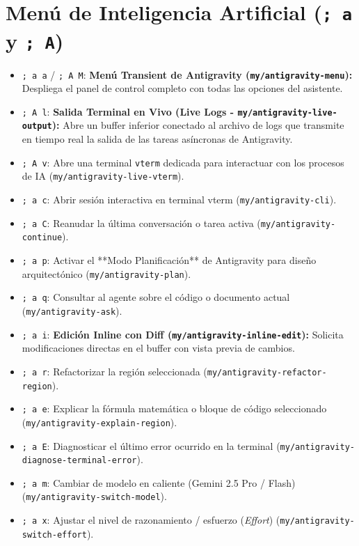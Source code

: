 \documentclass[11pt,book,spanish,alphabetic]{apuntes-scr}
\begin{document}
\section{Menú de Inteligencia Artificial (\texttt{; a} y \texttt{; A})}
\begin{itemize}[leftmargin=8mm]
    \item \texttt{; a a} / \texttt{; A M}: \textbf{Menú Transient de Antigravity (\texttt{my/antigravity-menu}):} Despliega el panel de control completo con todas las opciones del asistente.
    \item \texttt{; A l}: \textbf{Salida Terminal en Vivo (Live Logs - \texttt{my/antigravity-live-output}):} Abre un buffer inferior conectado al archivo de logs que transmite en tiempo real la salida de las tareas asíncronas de Antigravity.
    \item \texttt{; A v}: Abre una terminal \texttt{vterm} dedicada para interactuar con los procesos de IA (\texttt{my/antigravity-live-vterm}).
    \item \texttt{; a c}: Abrir sesión interactiva en terminal vterm (\texttt{my/antigravity-cli}).
    \item \texttt{; a C}: Reanudar la última conversación o tarea activa (\texttt{my/antigravity-continue}).
    \item \texttt{; a p}: Activar el **Modo Planificación** de Antigravity para diseño arquitectónico (\texttt{my/antigravity-plan}).
    \item \texttt{; a q}: Consultar al agente sobre el código o documento actual (\texttt{my/antigravity-ask}).
    \item \texttt{; a i}: \textbf{Edición Inline con Diff (\texttt{my/antigravity-inline-edit}):} Solicita modificaciones directas en el buffer con vista previa de cambios.
    \item \texttt{; a r}: Refactorizar la región seleccionada (\texttt{my/antigravity-refactor-region}).
    \item \texttt{; a e}: Explicar la fórmula matemática o bloque de código seleccionado (\texttt{my/antigravity-explain-region}).
    \item \texttt{; a E}: Diagnosticar el último error ocurrido en la terminal (\texttt{my/antigravity-diagnose-terminal-error}).
    \item \texttt{; a m}: Cambiar de modelo en caliente (Gemini 2.5 Pro / Flash) (\texttt{my/antigravity-switch-model}).
    \item \texttt{; a x}: Ajustar el nivel de razonamiento / esfuerzo (\textit{Effort}) (\texttt{my/antigravity-switch-effort}).

\end{itemize}
\end{document}
